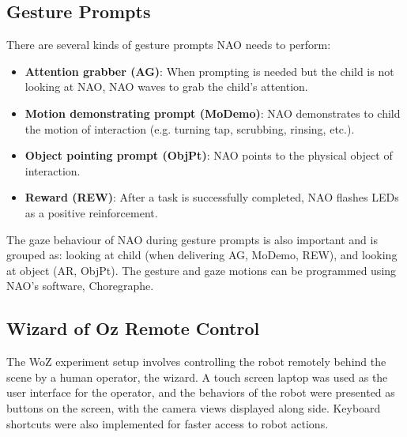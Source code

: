 \subsection{Gesture Prompts}
There are several kinds of gesture prompts NAO needs to perform:

\begin{itemize}
	\item \textbf{Attention grabber (AG)}:  When prompting is needed but the child is not looking at NAO, NAO waves to grab the child’s attention.
	\item \textbf{Motion demonstrating prompt (MoDemo)}:  NAO demonstrates to child the motion of interaction (e.g. turning tap, scrubbing, rinsing, etc.).
	\item \textbf{Object pointing prompt (ObjPt)}:  NAO points to the physical object of interaction.
	\item \textbf{Reward (REW)}:  After a task is successfully completed, NAO flashes LEDs as a positive reinforcement.
\end{itemize}

The gaze behaviour of NAO during gesture prompts is also important and is grouped as: looking at child (when delivering AG, MoDemo, REW), and looking at object (AR, ObjPt).  The gesture and gaze motions can be programmed using NAO's software, Choregraphe.

\subsection{Wizard of Oz Remote Control}
The WoZ experiment setup involves controlling the robot remotely behind the scene by a human operator, the wizard.  A touch screen laptop was used as the user interface for the operator, and the behaviors of the robot were presented as buttons on the screen, with the camera views displayed along side.  Keyboard shortcuts were also implemented for faster access to robot actions.
